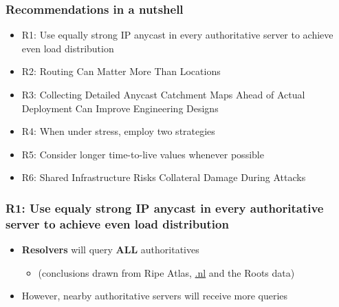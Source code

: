 \documentclass[11pt,show 
notes,notheorems,noamsthm,blank]{beamer} %
\begin{document}
\begin{frame}
 \frametitle{Recommendations in a nutshell}
 \begin{itemize}
  \item R1: Use equally strong IP anycast in every authoritative server to
    achieve even load distribution~\cite{Mueller17b}
    
  \item R2:  Routing Can Matter More Than Locations~\cite{Schmidt17a}
  
  \item R3: Collecting Detailed Anycast Catchment Maps Ahead of Actual
    Deployment Can Improve Engineering Designs~\cite{Vries17b}
    
  \item R4:    When under stress, employ two strategies~\cite{Moura16b}
  
  \item R5:  Consider longer time-to-live values whenever 
possible~\cite{Moura18b}
  
    \item R6:  Shared Infrastructure Risks Collateral Damage During 
Attacks~\cite{Moura16b}
    


  

 \end{itemize}

\end{frame}


\begin{frame}
 \frametitle{R1: Use equaly strong IP anycast in every authoritative server to
    achieve even load distribution}
    
    
    
\begin{figure}
\centering

  
  \label{fig:nl-deployment}

\end{figure}
\vspace{-0.5cm}
\begin{itemize}
\item \textbf{Resolvers} will query \textbf{ALL} 
authoritatives~\cite{Mueller17b}
\begin{itemize}
 \item (conclusions drawn from Ripe Atlas, \url{.nl} and the Roots data)
\end{itemize}

\item However, nearby authoritative servers will receive more queries


\end{itemize}



\end{frame}
\end{document}
